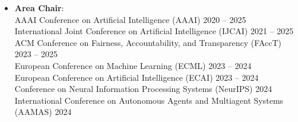 \documentclass[localFont,alternative]{documentMETADATA}
\begin{document}
\begin{itemize}
    \item {\bf Area Chair}: \\
    AAAI Conference on Artificial Intelligence (AAAI) \hfill {2020 -- 2025}\\
    International Joint Conference on Artificial Intelligence (IJCAI) \hfill {2021 -- 2025}\\
    ACM Conference on Fairness, Accountability, and Transparency (FAccT) \hfill {2023 -- 2025}\\
    European Conference on Machine Learning (ECML) \hfill{2023 -- 2024}\\
  	European Conference on Artificial Intelligence (ECAI) \hfill {2023 -- 2024}\\
  	Conference on Neural Information Processing Systems (NeurIPS)
  	\hfill {2024}\\
    International Conference on Autonomous Agents and Multiagent Systems (AAMAS) \hfill{2024}
  \end{itemize}
\end{document}
